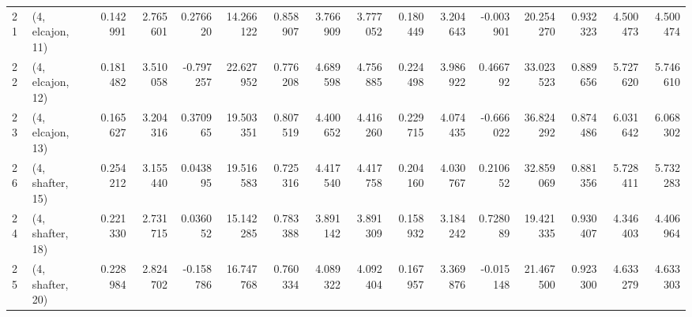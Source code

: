 \begin{tabular}{llrrrrrrrrrrrrrr}
21 &  (4, elcajon, 11) &   0.142991 &  2.765601 &  0.276620 &  14.266122 &  0.858907 &   3.766909 &  3.777052 &  0.180449 &  3.204643 & -0.003901 &   20.254270 &  0.932323 &   4.500473 &   4.500474 \\
22 &  (4, elcajon, 12) &   0.181482 &  3.510058 & -0.797257 &  22.627952 &  0.776208 &   4.689598 &  4.756885 &  0.224498 &  3.986922 &  0.466792 &   33.023523 &  0.889656 &   5.727620 &   5.746610 \\
23 &  (4, elcajon, 13) &   0.165627 &  3.204316 &  0.370965 &  19.503351 &  0.807519 &   4.400652 &  4.416260 &  0.229715 &  4.074435 & -0.666022 &   36.824292 &  0.874486 &   6.031642 &   6.068302 \\
26 &  (4, shafter, 15) &   0.254212 &  3.155440 &  0.043895 &  19.516583 &  0.725316 &   4.417540 &  4.417758 &  0.204160 &  4.030767 &  0.210652 &   32.859069 &  0.881356 &   5.728411 &   5.732283 \\
24 &  (4, shafter, 18) &   0.221330 &  2.731715 &  0.036052 &  15.142285 &  0.783388 &   3.891142 &  3.891309 &  0.158932 &  3.184242 &  0.728089 &   19.421335 &  0.930407 &   4.346403 &   4.406964 \\
25 &  (4, shafter, 20) &   0.228984 &  2.824702 & -0.158786 &  16.747768 &  0.760334 &   4.089322 &  4.092404 &  0.167957 &  3.369876 & -0.015148 &   21.467500 &  0.923300 &   4.633279 &   4.633303 \\
\bottomrule
\end{tabular}
